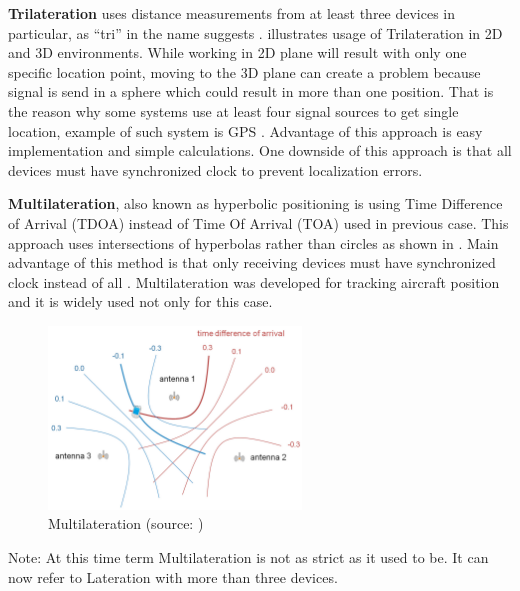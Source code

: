 \textbf{Trilateration} uses distance measurements from at least three devices in particular, as \enquote{tri} in the name suggests \cite{RAinWILTaS}.  illustrates usage of Trilateration in 2D and 3D environments. While working in 2D plane will result with only one specific location point, moving to the 3D plane can create a problem because signal is send in a sphere which could result in more than one position. That is the reason why some systems use at least four signal sources to get single location, example of such system is GPS \cite{GNSSGPS}. Advantage of this approach is easy implementation and simple calculations. One downside of this approach is that all devices must have synchronized clock \cite{RAinWILTaS} to prevent localization errors.

\medskip

\textbf{Multilateration}, also known as hyperbolic positioning is using Time Difference of Arrival (TDOA) instead of Time Of Arrival (TOA) used in previous case. This approach uses intersections of hyperbolas rather than circles as shown in . Main advantage of this method is that only receiving devices must have synchronized clock instead of all \cite{PLTaA}. Multilateration was developed for tracking aircraft position and it is widely used not only for this case.

\begin{figure}[h!]
	\begin{centering}
		\includegraphics[width=0.6\textwidth]{img/multilateration}
		\par\end{centering}
	\caption{Multilateration (source: \cite{HPwAA})\label{fig:Multilateration}}
	\label{fig02c02}
\end{figure}

Note: At this time term Multilateration is not as strict as it used to be. It can now refer to Lateration with more than three devices.

